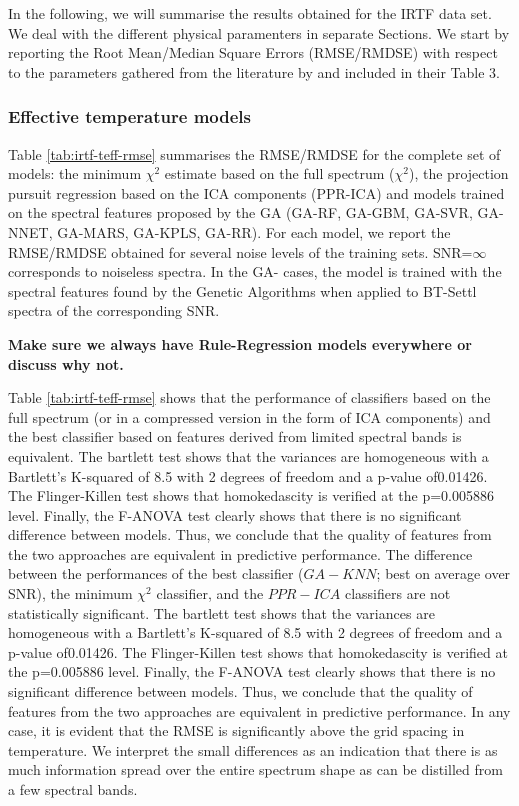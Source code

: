 
In the following, we will summarise the results obtained for the IRTF
data set. We deal with the different physical paramenters in separate
Sections. We start by reporting the Root Mean/Median Square Errors
(RMSE/RMDSE) with respect to the parameters gathered from the
literature by \cite{cesetti} and included in their Table 3.

\subsubsection{Effective temperature models}

Table \ref{tab:irtf-teff-rmse} summarises the RMSE/RMDSE for the
complete set of models: the minimum $\chi^2$ estimate based on the
full spectrum ($\chi^2$), the projection pursuit regression based on
the ICA components (PPR-ICA) and models trained on the spectral
features proposed by the GA (GA-RF, GA-GBM, GA-SVR, GA-NNET, GA-MARS,
GA-KPLS, GA-RR). For each model, we report the RMSE/RMDSE obtained for
several noise levels of the training sets.  SNR=$\infty$ corresponds
to noiseless spectra. In the GA- cases, the model is trained with the
spectral features found by the Genetic Algorithms when applied to
BT-Settl spectra of the corresponding SNR.

{\bf Make sure we always have Rule-Regression models everywhere or
  discuss why not.}
  
Table \ref{tab:irtf-teff-rmse} shows that the performance of classifiers
based on the full spectrum (or in a compressed version in the form of
ICA components) and the best classifier based on features derived from
limited spectral bands is equivalent. The bartlett test shows that the
variances are homogeneous with a Bartlett\textquoteright s K-squared
of 8.5 with 2 degrees of freedom and a p-value of0.01426. The
Flinger-Killen test shows that homokedascity is verified at the
p=0.005886 level. Finally, the F-ANOVA test clearly shows that there
is no significant difference between models. Thus, we conclude that
the quality of features from the two approaches are equivalent in
predictive performance.  The difference between the performances of
the best classifier ($GA-KNN$; best on average over SNR), the minimum
$\chi^2$ classifier, and the $PPR-ICA$ classifiers are not
statistically significant. The bartlett test shows that the variances
are homogeneous with a Bartlett\textquoteright s K-squared of 8.5 with
2 degrees of freedom and a p-value of0.01426. The Flinger-Killen test
shows that homokedascity is verified at the p=0.005886 level. Finally,
the F-ANOVA test clearly shows that there is no significant difference
between models. Thus, we conclude that the quality of features from
the two approaches are equivalent in predictive performance.  In any
case, it is evident that the RMSE is significantly above the grid
spacing in temperature. We interpret the small differences as an
indication that there is as much information spread over the entire
spectrum shape as can be distilled from a few spectral bands.

